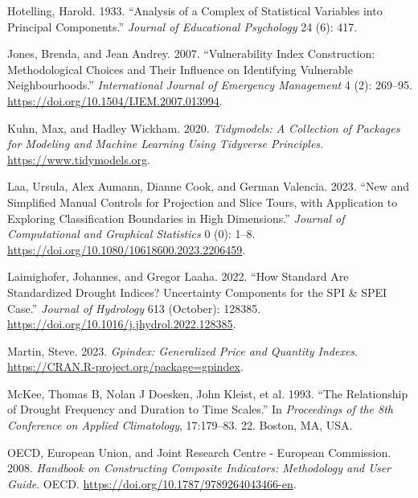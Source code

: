 \documentclass[
]{interact}
\newlength{\cslhangindent}
\newlength{\cslentryspacingunit} %
\newenvironment{CSLReferences}[2] %
 {%
  \setlength{\parindent}{0pt}
  \ifodd #1
  \let\oldpar\par
  \def\par{\hangindent=\cslhangindent\oldpar}
  \fi
  \setlength{\parskip}{#2\cslentryspacingunit}
 }%
 {}
\begin{document}
\begin{CSLReferences}{1}{0}
\leavevmode{}%
Hotelling, Harold. 1933. {``Analysis of a Complex of Statistical
Variables into Principal Components.''} \emph{Journal of Educational
Psychology} 24 (6): 417.

\leavevmode{}%
Jones, Brenda, and Jean Andrey. 2007. {``Vulnerability Index
Construction: Methodological Choices and Their Influence on Identifying
Vulnerable Neighbourhoods.''} \emph{International Journal of Emergency
Management} 4 (2): 269--95.
\url{https://doi.org/10.1504/IJEM.2007.013994}.

\leavevmode{}%
Kuhn, Max, and Hadley Wickham. 2020. \emph{Tidymodels: A Collection of
Packages for Modeling and Machine Learning Using Tidyverse Principles.}
\url{https://www.tidymodels.org}.

\leavevmode{}%
Laa, Ursula, Alex Aumann, Dianne Cook, and German Valencia. 2023. {``New
and Simplified Manual Controls for Projection and Slice Tours, with
Application to Exploring Classification Boundaries in High
Dimensions.''} \emph{Journal of Computational and Graphical Statistics}
0 (0): 1--8. \url{https://doi.org/10.1080/10618600.2023.2206459}.

\leavevmode{}%
Laimighofer, Johannes, and Gregor Laaha. 2022. {``How Standard Are
Standardized Drought Indices? {Uncertainty} Components for the {SPI} \&
{SPEI} Case.''} \emph{Journal of Hydrology} 613 (October): 128385.
\url{https://doi.org/10.1016/j.jhydrol.2022.128385}.

\leavevmode{}%
Martin, Steve. 2023. \emph{Gpindex: Generalized Price and Quantity
Indexes}. \url{https://CRAN.R-project.org/package=gpindex}.

\leavevmode{}%
McKee, Thomas B, Nolan J Doesken, John Kleist, et al. 1993. {``The
Relationship of Drought Frequency and Duration to Time Scales.''} In
\emph{Proceedings of the 8th Conference on Applied Climatology},
17:179--83. 22. Boston, MA, USA.

\leavevmode{}%
OECD, European Union, and Joint Research Centre - European Commission.
2008. \emph{Handbook on {Constructing} {Composite} {Indicators}:
{Methodology} and {User} {Guide}}. OECD.
\url{https://doi.org/10.1787/9789264043466-en}.


\end{CSLReferences}
\end{document}
